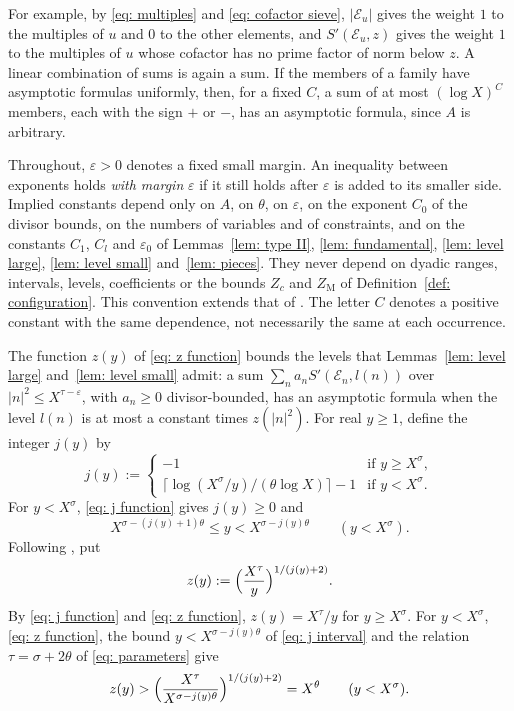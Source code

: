 \documentclass{article}
\numberwithin{equation}{section}
\newcommand{\Le}{\leqslant}
\newcommand{\Ge}{\geqslant}
\begin{document}
For example, by \eqref{eq: multiples} and \eqref{eq: cofactor sieve}, $|\mathcal{E}_u|$ gives the weight $1$ to the multiples of $u$ and $0$ to the other elements, and $S'(\mathcal{E}_u, z)$ gives the weight $1$ to the multiples of $u$ whose cofactor has no prime factor of norm below $z$. A linear combination of sums is again a sum. If the members of a family have asymptotic formulas uniformly, then, for a fixed $C$, a sum of at most $(\log X)^C$ members, each with the sign $+$ or $-$, has an asymptotic formula, since $A$ is arbitrary.

Throughout, $\varepsilon > 0$ denotes a fixed small margin. An inequality between exponents holds \emph{with margin} $\varepsilon$ if it still holds after $\varepsilon$ is added to its smaller side. Implied constants depend only on $A$, on $\theta$, on $\varepsilon$, on the exponent $C_0$ of the divisor bounds, on the numbers of variables and of constraints, and on the constants $C_1$, $C_l$ and $\varepsilon_0$ of Lemmas~\ref{lem: type II}, \ref{lem: fundamental}, \ref{lem: level large}, \ref{lem: level small} and~\ref{lem: pieces}. They never depend on dyadic ranges, intervals, levels, coefficients or the bounds $Z_c$ and $Z_{\mathrm{M}}$ of Definition~\ref{def: configuration}. This convention extends that of \citet[p.~121]{harman2001gaussian}. The letter $C$ denotes a positive constant with the same dependence, not necessarily the same at each occurrence.

The function $z(y)$ of \eqref{eq: z function} bounds the levels that Lemmas~\ref{lem: level large} and~\ref{lem: level small} admit: a sum $\sum_n a_n S'(\mathcal{E}_n, l(n))$ over $|n|^2 \Le X^{\tau - \varepsilon}$, with $a_n \Ge 0$ divisor-bounded, has an asymptotic formula when the level $l(n)$ is at most a constant times $z(|n|^2)$. For real $y \Ge 1$, define the integer $j(y)$ by
\begin{equation}
\label{eq: j function}
j(y) := \begin{cases} -1 & \text{if } y \Ge X^{\sigma}, \\ \bigl\lceil \log(X^{\sigma}/y)/(\theta \log X) \bigr\rceil - 1 & \text{if } y < X^{\sigma}. \end{cases}
\end{equation}
For $y < X^{\sigma}$, \eqref{eq: j function} gives $j(y) \Ge 0$ and
\begin{equation}
\label{eq: j interval}
X^{\sigma - (j(y)+1)\theta} \Le y < X^{\sigma - j(y)\theta} \qquad (y < X^{\sigma}).
\end{equation}
Following \citet[p.~128]{harman2001gaussian}, put
\begin{equation}
\label{eq: z function}
z(y) := \Bigl( \frac{X^{\tau}}{y} \Bigr)^{1/(j(y) + 2)}.
\end{equation}
By \eqref{eq: j function} and \eqref{eq: z function}, $z(y) = X^{\tau}/y$ for $y \Ge X^{\sigma}$. For $y < X^{\sigma}$, \eqref{eq: z function}, the bound $y < X^{\sigma - j(y)\theta}$ of \eqref{eq: j interval} and the relation $\tau = \sigma + 2\theta$ of \eqref{eq: parameters} give
\begin{equation}
\label{eq: z lower}
z(y) > \Bigl( \frac{X^{\tau}}{X^{\sigma - j(y)\theta}} \Bigr)^{1/(j(y)+2)} = X^{\theta} \qquad (y < X^{\sigma}).
\end{equation}
\end{document}
